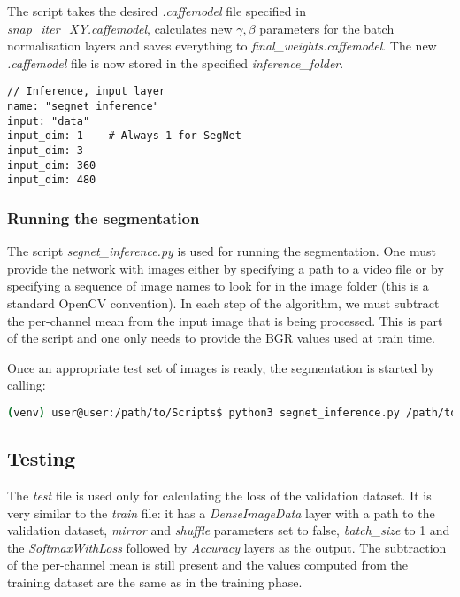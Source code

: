 The script takes the desired \textit{.caffemodel} file specified in \textit{snap\_iter\_XY.caffemodel}, calculates new $ \gamma, \beta $ parameters for the batch normalisation layers and saves everything to \textit{final\_weights.caffemodel}. The new \textit{.caffemodel} file is now stored in the specified \textit{inference\_folder}. \cite{issue}

\begin{lstlisting}[caption={Replacing input layer type in \textit{inference.prototxt} \cite{filip_github}},captionpos=b]
// Inference, input layer
name: "segnet_inference"
input: "data"
input_dim: 1	# Always 1 for SegNet
input_dim: 3
input_dim: 360
input_dim: 480
\end{lstlisting}

\subsubsection{Running the segmentation}

The script \textit{segnet\_inference.py} is used for running the segmentation. One must provide the network with images either by specifying a path to a video file or by specifying a sequence of image names to look for in the image folder (this is a standard OpenCV convention). In each step of the algorithm, we must subtract the per-channel mean from the input image that is being processed. This is part of the script and one only needs to provide the BGR values used at train time.

Once an appropriate test set of images is ready, the segmentation is started by calling:

\begin{lstlisting}[language=bash]
(venv) user@user:/path/to/Scripts$ python3 segnet_inference.py /path/to/inference.prototxt /path/to/final_weights.caffemodel /path/to/videofile.avi 
\end{lstlisting}

\subsection{Testing}

The \textit{test} file is used only for calculating the loss of the validation dataset. It is very similar to the \textit{train} file: it has a \textit{DenseImageData} layer with a path to the validation dataset, \textit{mirror} and \textit{shuffle} parameters set to false, \textit{batch\_size} to 1 and the \textit{SoftmaxWithLoss} followed by \textit{Accuracy} layers as the output. The subtraction of the per-channel mean is still present and the values computed from the training dataset are the same as in the training phase. 

